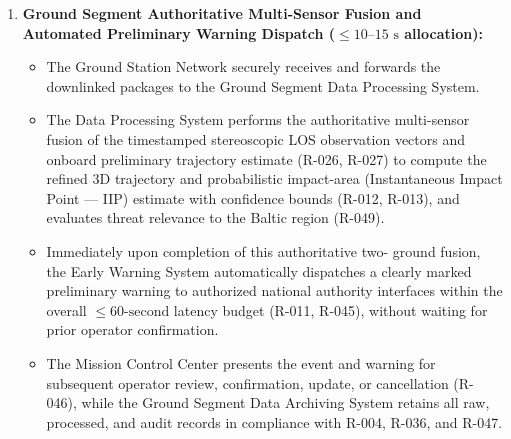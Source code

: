 \begin{enumerate}
\begin{itemize}
        \item The two  satellites encrypt and downlink both their timestamped stereoscopic LOS observation packages (with associated covariance and attitude uncertainty metadata) and their onboard preliminary 3D trajectory estimate to the Ground Segment via direct ground-station links or mandatory  relay paths.
    \end{itemize}
    \item \textbf{Ground Segment Authoritative Multi-Sensor Fusion and Automated Preliminary Warning Dispatch ($\le 10\text{--}15\text{ s}$ allocation):}
    \begin{itemize}
        \item The Ground Station Network securely receives and forwards the downlinked  packages to the Ground Segment Data Processing System.
        \item The Data Processing System performs the authoritative multi-sensor fusion of the timestamped stereoscopic LOS observation vectors and onboard preliminary trajectory estimate (R-026, R-027) to compute the refined 3D trajectory and probabilistic impact-area (Instantaneous Impact Point --- IIP) estimate with confidence bounds (R-012, R-013), and evaluates threat relevance to the Baltic region (R-049).
        \item Immediately upon completion of this authoritative two- ground fusion, the Early Warning System automatically dispatches a clearly marked preliminary warning to authorized national authority interfaces within the overall $\le 60\text{-second}$ latency budget (R-011, R-045), without waiting for prior operator confirmation.
        \item The Mission Control Center presents the event and warning for subsequent operator review, confirmation, update, or cancellation (R-046), while the Ground Segment Data Archiving System retains all raw, processed, and audit records in compliance with R-004, R-036, and R-047.
    \end{itemize}
\end{enumerate} 
